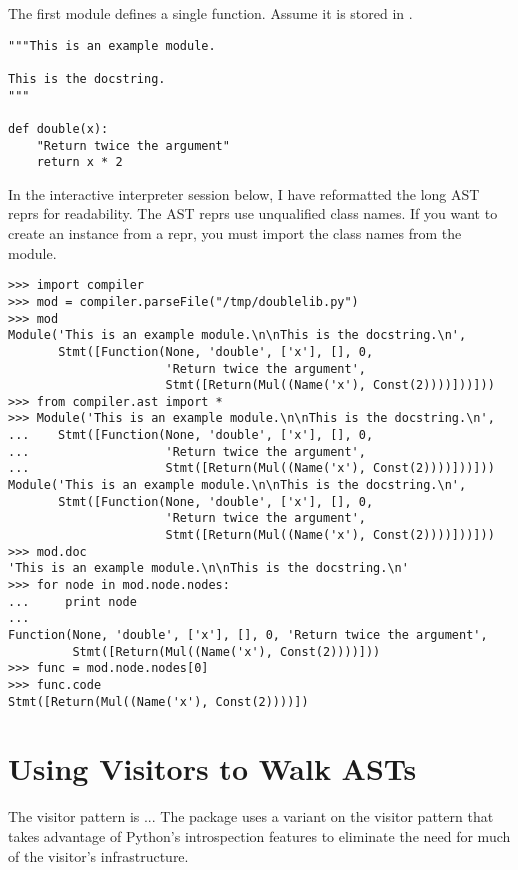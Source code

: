 The first module defines a single function.  Assume it is stored in
. 

\begin{verbatim}
"""This is an example module.

This is the docstring.
"""

def double(x):
    "Return twice the argument"
    return x * 2
\end{verbatim}

In the interactive interpreter session below, I have reformatted the
long AST reprs for readability.  The AST reprs use unqualified class
names.  If you want to create an instance from a repr, you must import
the class names from the  module.

\begin{verbatim}
>>> import compiler
>>> mod = compiler.parseFile("/tmp/doublelib.py")
>>> mod
Module('This is an example module.\n\nThis is the docstring.\n', 
       Stmt([Function(None, 'double', ['x'], [], 0,
                      'Return twice the argument', 
                      Stmt([Return(Mul((Name('x'), Const(2))))]))]))
>>> from compiler.ast import *
>>> Module('This is an example module.\n\nThis is the docstring.\n', 
...    Stmt([Function(None, 'double', ['x'], [], 0,
...                   'Return twice the argument', 
...                   Stmt([Return(Mul((Name('x'), Const(2))))]))]))
Module('This is an example module.\n\nThis is the docstring.\n', 
       Stmt([Function(None, 'double', ['x'], [], 0,
                      'Return twice the argument', 
                      Stmt([Return(Mul((Name('x'), Const(2))))]))]))
>>> mod.doc
'This is an example module.\n\nThis is the docstring.\n'
>>> for node in mod.node.nodes:
...     print node
... 
Function(None, 'double', ['x'], [], 0, 'Return twice the argument',
         Stmt([Return(Mul((Name('x'), Const(2))))]))
>>> func = mod.node.nodes[0]
>>> func.code
Stmt([Return(Mul((Name('x'), Const(2))))])
\end{verbatim}

\section{Using Visitors to Walk ASTs}


The visitor pattern is ...  The  package uses a
variant on the visitor pattern that takes advantage of Python's
introspection features to eliminate the need for much of the visitor's
infrastructure.

